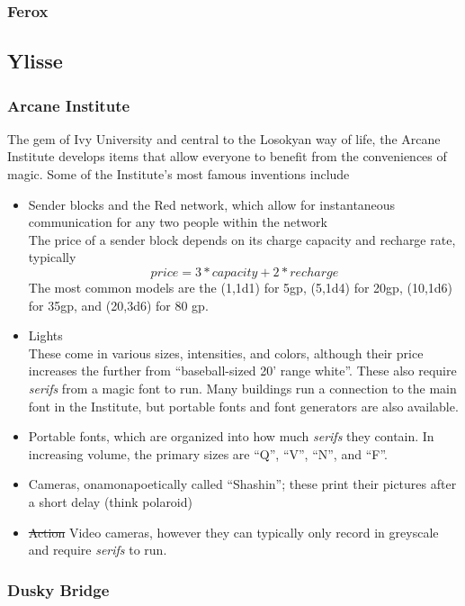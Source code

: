 \subsubsection{Ferox}
\label{places:ferox}

\subsection{Ylisse}
\label{nations:ylisse}

\subsubsection{Arcane Institute}
\label{places:arcaneinstitute}
The gem of Ivy University and central to the Losokyan way of life, the Arcane Institute develops items that allow everyone to benefit from the conveniences of magic. Some of the Institute's most famous inventions include
\begin{itemize}
\item Sender blocks and the Red network, which allow for instantaneous communication for any two people within the network\\
The price of a sender block depends on its charge capacity and recharge rate, typically
\[ price = 3 * capacity + 2*recharge \]
The most common models are the (1,1d1) for 5gp, (5,1d4) for 20gp, (10,1d6) for 35gp, and (20,3d6) for 80 gp. 
\item Lights\\
These come in various sizes, intensities, and colors, although their price increases the further from ``baseball-sized 20' range white''. These also require \textit{serifs} from a magic font to run. Many buildings run a connection to the main font in the Institute, but portable fonts and font generators are also available.
\item Portable fonts, which are organized into how much \textit{serifs} they contain. In increasing volume, the primary sizes are ``Q'', ``V'', ``N'', and ``F''. 
\item Cameras, onamonapoetically called ``Shashin''; these print their pictures after a short delay (think polaroid)
\item \st{Action} Video cameras, however they can typically only record in greyscale and require \textit{serifs} to run.
\end{itemize}

\subsubsection{Dusky Bridge}
\label{places:duskybridge}


